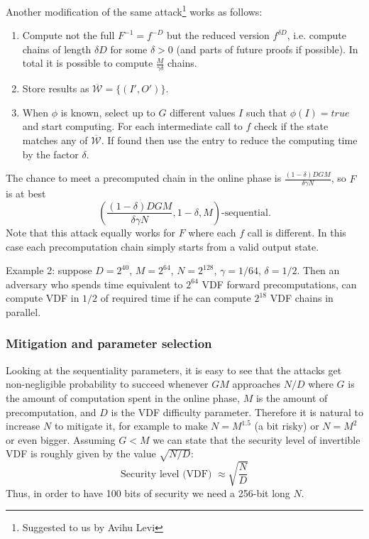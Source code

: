 \documentclass{article}
\begin{document}
Another modification of the same attack\footnote{Suggested to us by Avihu Levi} works as follows:
\begin{enumerate}
    \item Compute not the full $F^{-1} = f^{-D}$ but the reduced version $f^{ \delta D}$, i.e. compute chains of length $ \delta D$ for some $\delta>0$ (and parts of future proofs if possible). In total it is possible to compute $\frac{M}{\gamma \delta}$ chains.
    \item Store results as $\overline{\mathcal{W}}=\{(I',O')\}$.
    \item When $\phi$ is known, select up to $G$ different values  $I$ such that $\phi(I)=true$ and start computing. For each intermediate call to $f$ check if the state matches any of $\overline{\mathcal{W}}$. If found then use the entry to reduce the computing time by the factor $ \delta$.
\end{enumerate}
The chance to meet a precomputed chain in the online phase is $\frac{(1-\delta)DGM}{ \delta\gamma N}$, so $F$ is at best
$$
\left(\frac{(1-\delta)DGM}{ \delta\gamma N},1-\delta,M\right)\text{-sequential.}
$$
 Note that this attack equally works for $F$ where each $f$ call is different. In this case each precomputation chain simply starts from a valid output state.



Example 2: suppose $D=2^{40}$, $M=2^{64}$, $N=2^{128}$, $\gamma=1/64$, $\delta=1/2$. Then an adversary who spends time equivalent to $2^{64}$ VDF forward precomputations, can compute VDF in $1/2$ of required time if he can compute $2^{18}$ VDF chains in parallel.


\subsubsection{Mitigation and parameter selection}\label{sec:mitig}

Looking at the sequentiality parameters, it is easy to see that the attacks get non-negligible probability to succeed whenever  $GM$ approaches $N/D$ where $G$ is the amount of computation spent in the online phase, $M$ is the amount of precomputation, and $D$ is the VDF difficulty parameter. Therefore it is natural to increase $N$ to mitigate it, for example to make $N = M^{1.5}$ (a bit risky)
 or $N=M^2$ or even bigger.  Assuming $G<M$ we can state that the security level of invertible VDF is roughly given by the value $\sqrt{N/D}$:
 \begin{equation}\label{eq:level}
     \text{Security level (VDF) }\approx \sqrt{\frac{N}{D}} \end{equation}
     Thus, in order to have 100 bits of security we need a 256-bit long $N$. 
 
\end{document}
